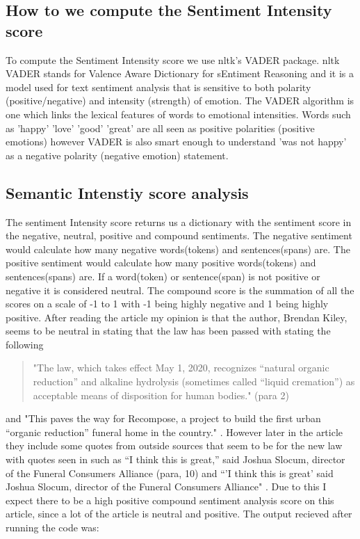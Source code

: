 \documentclass{article}
\begin{document}
\subsection{How to we compute the Sentiment Intensity score}
To compute the Sentiment Intensity score we use nltk's VADER package. nltk VADER stands for Valence Aware Dictionary for sEntiment Reasoning and it is a model used for text sentiment analysis that is sensitive to both polarity (positive/negative) and intensity (strength) of emotion. The VADER algorithm is one which links the lexical features of words to emotional intensities. Words such as 'happy' 'love' 'good' 'great' are all seen as positive polarities (positive emotions) however VADER is also smart enough to understand 'was not happy' as a negative polarity (negative emotion) statement.

\subsection{Semantic Intenstiy score analysis}
The sentiment Intensity score returns us a dictionary with the sentiment score in the negative, neutral, positive and compound sentiments. The negative sentiment would calculate how many negative words(tokens) and sentences(spans) are. The positive sentiment would calculate how many positive words(tokens) and sentences(spans) are. If a word(token) or sentence(span) is not positive or negative it is considered neutral. The compound score is the summation of all the scores on a scale of -1 to 1 with -1 being highly negative and 1 being highly positive. After reading the article my opinion is that the author, Brendan Kiley, seems to be neutral in stating that the law has been passed with \parencite[]{Kiley_2019} stating the following
\begin{quote}
"The law, which takes effect May 1, 2020, recognizes “natural organic reduction” and alkaline hydrolysis (sometimes called “liquid cremation”) as acceptable means of disposition for human bodies." (para 2)
\end{quote}
and "This paves the way for Recompose, a project to build the first urban “organic reduction” funeral home in the country." \parencite[]{Kiley_2019}. 
However later in the article they include some quotes from outside sources that seem to be for the new law with quotes seen in \parencite[]{Kiley_2019} such as “I think this is great,” said Joshua Slocum, director of the Funeral Consumers Alliance (para, 10) and “'I think this is great' said Joshua Slocum, director of the Funeral Consumers Alliance" \parencite[]{Kiley_2019}. Due to this I expect there to be a high positive compound sentiment analysis score on this article, since a lot of the article is neutral and positive. The output recieved after running the code was: 
\end{document}
